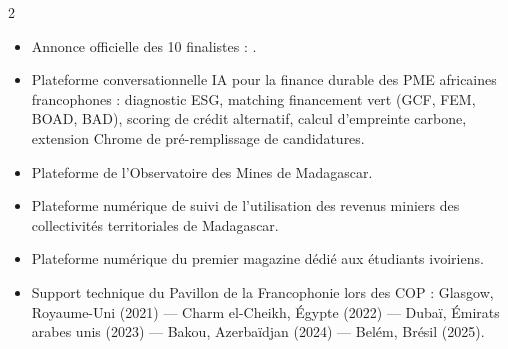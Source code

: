 \documentclass[10pt,a4paper,ragged2e,withhyper]{altacv}
\begin{document}
\begin{paracol}{2}
            \begin{itemize}
                \item Annonce officielle des 10 finalistes : .
                \item Plateforme conversationnelle IA pour la finance durable des PME africaines francophones : diagnostic ESG, matching financement vert (GCF, FEM, BOAD, BAD), scoring de crédit alternatif, calcul d'empreinte carbone, extension Chrome de pré-remplissage de candidatures.
            \end{itemize}
            \divider

            \begin{itemize}
                \item Plateforme de l'Observatoire des Mines de Madagascar.
            \end{itemize}
            \divider

            \begin{itemize}
                \item Plateforme numérique de suivi de l'utilisation des revenus miniers des collectivités territoriales de Madagascar.
            \end{itemize}
            \divider

            \begin{itemize}
                \item Plateforme numérique du premier magazine dédié aux étudiants ivoiriens.
            \end{itemize}


            \begin{itemize}
                \item Support technique du Pavillon de la Francophonie lors des COP : Glasgow, Royaume-Uni (2021) — Charm el-Cheikh, Égypte (2022) — Dubaï, Émirats arabes unis (2023) — Bakou, Azerbaïdjan (2024) — Belém, Brésil (2025).
            \end{itemize}
            \divider


\end{paracol}
\end{document}
